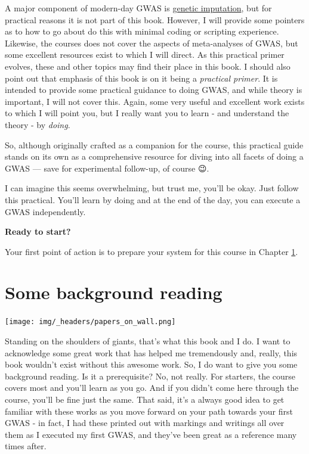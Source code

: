 \documentclass[
]{book}
\begin{document}
A major component of modern-day GWAS is \href{https://www.nature.com/articles/nrg2796}{genetic imputation}, but for practical reasons it is not part of this book. However, I will provide some pointers as to how to go about do this with minimal coding or scripting experience. Likewise, the courses does not cover the aspects of meta-analyses of GWAS, but some excellent resources exist to which I will direct. As this practical primer evolves, these and other topics may find their place in this book.
I should also point out that emphasis of this book is on it being a \emph{practical primer}. It is intended to provide some practical guidance to doing GWAS, and while theory is important, I will not cover this. Again, some very useful and excellent work exists to which I will point you, but I really want you to learn - and understand the theory - by \emph{doing}.

So, although originally crafted as a companion for the course, this practical guide stands on its own as a comprehensive resource for diving into all facets of doing a GWAS --- save for experimental follow-up, of course 😉.

I can imagine this seems overwhelming, but trust me, you'll be okay. Just follow this practical. You'll learn by doing and at the end of the day, you can execute a GWAS independently.

\textbf{Ready to start?}

Your first point of action is to prepare your system for this course in Chapter \ref{somebackgroundreading}.

\hypertarget{somebackgroundreading}{%
\chapter{Some background reading}\label{somebackgroundreading}}

\texttt{[image: img/\_headers/papers\_on\_wall.png]}

Standing on the shoulders of giants, that's what this book and I do. I want to acknowledge some great work that has helped me tremendously and, really, this book wouldn't exist without this awesome work. So, I do want to give you some background reading. Is it a prerequisite? No, not really. For starters, the course covers most and you'll learn as you go. And if you didn't come here through the course, you'll be fine just the same. That said, it's a always good idea to get familiar with these works as you move forward on your path towards your first GWAS - in fact, I had these printed out with markings and writings all over them as I executed my first GWAS, and they've been great as a reference many times after.
\end{document}
